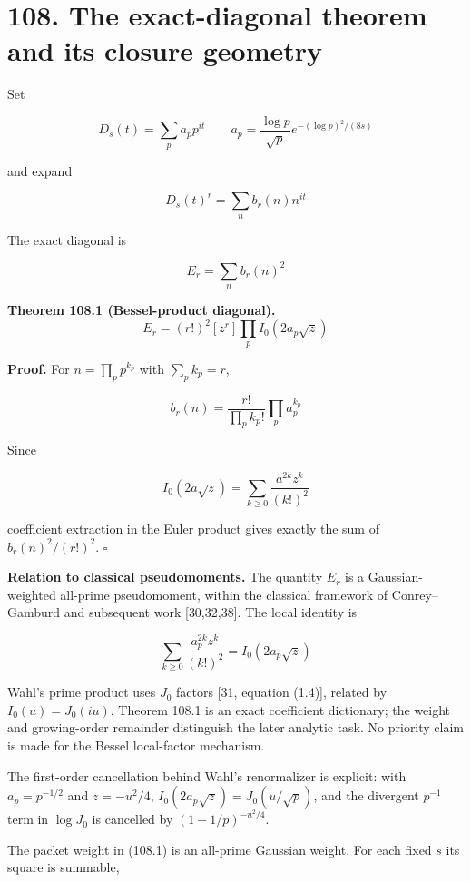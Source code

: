 \documentclass[
  11pt,
]{book}
\renewenvironment{quote}
  {\begin{tcolorbox}[
      enhanced,
      breakable,
      colback=tncream,
      colframe=tnrust,
      boxrule=0.8pt,
      arc=1.5pt,
      left=7pt,
      right=7pt,
      top=6pt,
      bottom=6pt]}
  {\end{tcolorbox}}
\begin{document}
\section{108. The exact-diagonal theorem and its closure
geometry}\label{the-exact-diagonal-theorem-and-its-closure-geometry}

Set

\[
D_s(t)=\sum_pa_pp^{it}
\qquad
a_p=\frac{\log p}{\sqrt p}
e^{-(\log p)^2/(8s)}
\tag{108.1}
\]

and expand

\[
D_s(t)^r=\sum_nb_r(n)n^{it}
\tag{108.2}
\]

The exact diagonal is

\[
E_r=\sum_nb_r(n)^2
\tag{108.3}
\]

\begin{quote}
\textbf{Theorem 108.1 (Bessel-product diagonal).} \[
\boxed{
E_r=(r!)^2[z^r]\prod_pI_0(2a_p\sqrt z)
}
\tag{108.4}
\]
\end{quote}

\textbf{Proof.} For \(n=\prod_pp^{k_p}\) with \(\sum_pk_p=r\),

\[
b_r(n)=\frac{r!}{\prod_pk_p!}\prod_pa_p^{k_p}
\]

Since

\[
I_0(2a\sqrt z)
=\sum_{k\ge0}\frac{a^{2k}z^k}{(k!)^2}
\]

coefficient extraction in the Euler product gives exactly the sum of
\(b_r(n)^2/(r!)^2\). \(\square\)

\textbf{Relation to classical pseudomoments.} The quantity \(E_r\) is a
Gaussian-weighted all-prime pseudomoment, within the classical framework
of Conrey--Gamburd and subsequent work {[}30,32,38{]}. The local
identity is

\[
\sum_{k\ge0}\frac{a_p^{2k}z^k}{(k!)^2}
=I_0(2a_p\sqrt z)
\tag{108.4a}
\]

Wahl's prime product uses \(J_0\) factors {[}31, equation (1.4){]},
related by \(I_0(u)=J_0(iu)\). Theorem 108.1 is an exact coefficient
dictionary; the weight and growing-order remainder distinguish the later
analytic task. No priority claim is made for the Bessel local-factor
mechanism.

The first-order cancellation behind Wahl's renormalizer is explicit:
with \(a_p=p^{-1/2}\) and \(z=-u^2/4\),
\(I_0(2a_p\sqrt z)=J_0(u/\sqrt p)\), and the divergent \(p^{-1}\) term
in \(\log J_0\) is cancelled by \((1-1/p)^{-u^2/4}\).

The packet weight in (108.1) is an all-prime Gaussian weight. For each
fixed \(s\) its square is summable,
\end{document}
